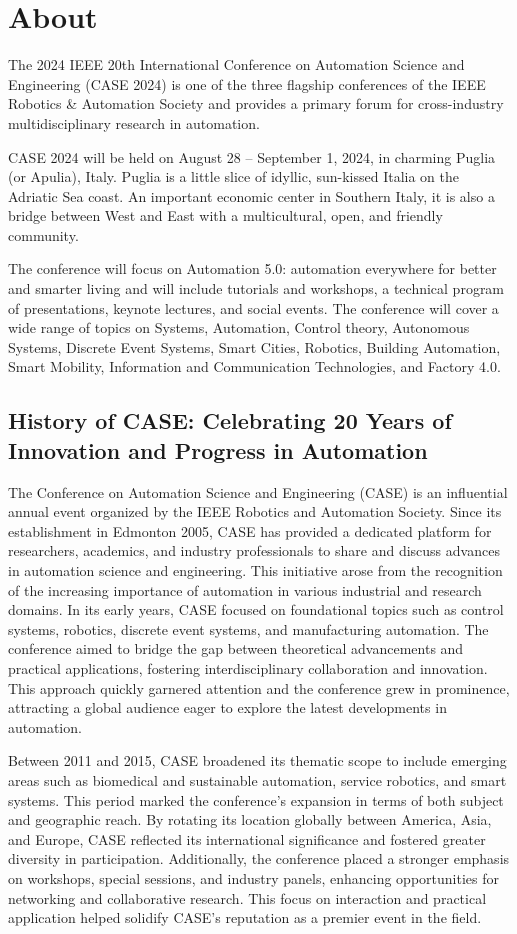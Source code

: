 \documentclass[
	openany, %
	parskip=full, %
	12pt, %
	a4paper, %
]{conferencebooklet} %
\begin{document}
\chapter{About}
The 2024 IEEE 20th International Conference on Automation Science and Engineering (CASE 2024) is one of the three flagship conferences of the IEEE Robotics \& Automation Society and provides a primary forum for cross-industry multidisciplinary research in automation.

CASE 2024 will be held on August 28 – September 1, 2024, in charming Puglia (or Apulia), Italy. Puglia is a little slice of idyllic, sun-kissed Italia on the Adriatic Sea coast. An important economic center in Southern Italy, it is also a bridge between West and East with a multicultural, open, and friendly community.

The conference will focus on Automation 5.0: automation everywhere for better and smarter living and will include tutorials and workshops, a technical program of presentations, keynote lectures, and social events. The conference will cover a wide range of topics on Systems, Automation, Control theory, Autonomous Systems, Discrete Event Systems, Smart Cities, Robotics, Building Automation, Smart Mobility, Information and Communication Technologies, and Factory 4.0.

\section{History of CASE: Celebrating 20 Years of Innovation and Progress in Automation}
The Conference on Automation Science and Engineering (CASE) is an influential annual event organized by the IEEE Robotics and Automation Society. Since its establishment in Edmonton 2005, CASE has provided a dedicated platform for researchers, academics, and industry professionals to share and discuss advances in automation science and engineering. This initiative arose from the recognition of the increasing importance of automation in various industrial and research domains. In its early years, CASE focused on foundational topics such as control systems, robotics, discrete event systems, and manufacturing automation. The conference aimed to bridge the gap between theoretical advancements and practical applications, fostering interdisciplinary collaboration and innovation. This approach quickly garnered attention and the conference grew in prominence, attracting a global audience eager to explore the latest developments in automation.

Between 2011 and 2015, CASE broadened its thematic scope to include emerging areas such as biomedical and sustainable automation, service robotics, and smart systems. This period marked the conference’s expansion in terms of both subject and geographic reach. By rotating its location globally between America, Asia, and Europe, CASE reflected its international significance and fostered greater diversity in participation. Additionally, the conference placed a stronger emphasis on workshops, special sessions, and industry panels, enhancing opportunities for networking and collaborative research. This focus on interaction and practical application helped solidify CASE’s reputation as a premier event in the field.
\end{document}

